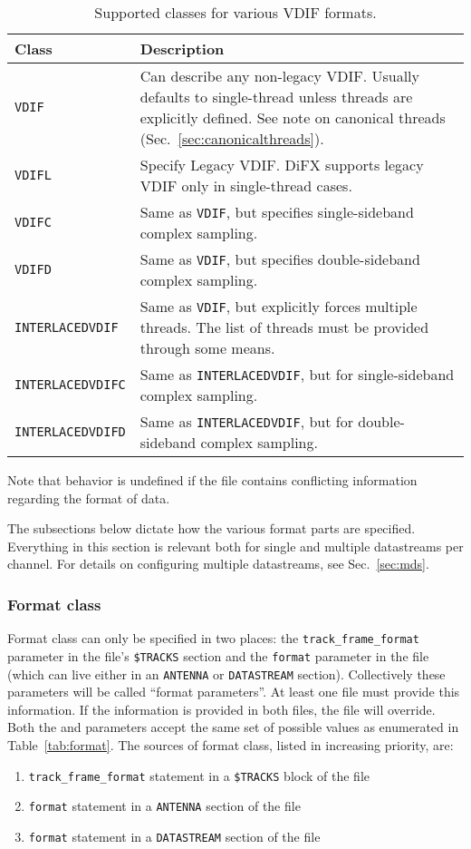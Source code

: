 \documentclass[12pt]{article}
\begin{document}
\begin{table}
\begin{center}
\caption{
Supported classes for various VDIF formats.
}
\label{tab:vdifclass}
\begin{tabular}{p{3.5cm}p{12cm}}
Class & Description \\
\hline
{\tt VDIF} & Can describe any non-legacy VDIF.  Usually defaults to single-thread unless threads are explicitly defined.  See note on canonical threads (Sec.~\ref{sec:canonicalthreads}). \\
{\tt VDIFL} & Specify Legacy VDIF.  DiFX supports legacy VDIF only in single-thread cases. \\
{\tt VDIFC} & Same as {\tt VDIF}, but specifies single-sideband complex sampling. \\
{\tt VDIFD} & Same as {\tt VDIF}, but specifies double-sideband complex sampling. \\
{\tt INTERLACEDVDIF} & Same as {\tt VDIF}, but explicitly forces multiple threads.  The list of threads must be provided through some means. \\
{\tt INTERLACEDVDIFC} & Same as {\tt INTERLACEDVDIF}, but for single-sideband complex sampling. \\
{\tt INTERLACEDVDIFD} & Same as {\tt INTERLACEDVDIF}, but for double-sideband complex sampling. \\
\end{tabular}
\end{center}
\end{table}

Note that behavior is undefined if the \vx file contains conflicting information regarding the format of data.

The subsections below dictate how the various format parts are specified.
Everything in this section is relevant both for single and multiple datastreams per channel.
For details on configuring multiple datastreams, see Sec.~\ref{sec:mds}.

\subsubsection{Format class}

Format class can only be specified in two places: the {\tt track\_frame\_format} parameter in the \vx file's {\tt \$TRACKS} section and the {\tt format} parameter in the \vd file (which can live either in an {\tt ANTENNA} or {\tt DATASTREAM} section).
Collectively these parameters will be called ``format parameters''.
At least one file must provide this information.
If the information is provided in both files, the \vd file will override.
Both the \vx and \vd parameters accept the same set of possible values as enumerated in Table~\ref{tab:format}.
The sources of format class, listed in increasing priority, are:
\begin{enumerate}
\item {\tt track\_frame\_format} statement in a {\tt \$TRACKS} block of the \vx file
\item {\tt format} statement in a {\tt ANTENNA} section of the \vd file
\item {\tt format} statement in a {\tt DATASTREAM} section of the \vd file
\end{enumerate}
\end{document}
